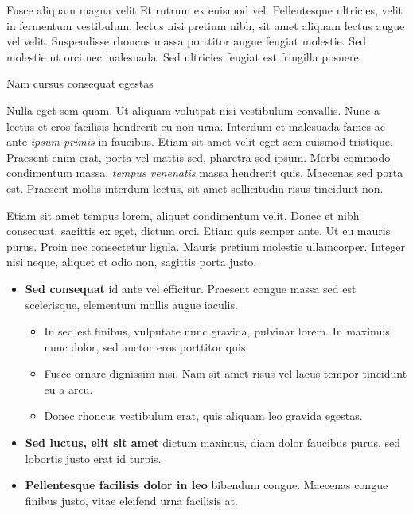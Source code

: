 \documentclass[final]{beamer}
\newlength{\colwidth}
\begin{document}
\begin{frame}[t]
\begin{columns}[t]
\begin{column}{\colwidth}
\begin{block}{Fusce aliquam magna velit}
    Et rutrum ex euismod vel. Pellentesque ultricies, velit in fermentum
    vestibulum, lectus nisi pretium nibh, sit amet aliquam lectus augue vel
    velit. Suspendisse rhoncus massa porttitor augue feugiat molestie. Sed
    molestie ut orci nec malesuada. Sed ultricies feugiat est fringilla
    posuere.

\vspace{1em}

  \end{block}

  \begin{block}{Nam cursus consequat egestas}

    Nulla eget sem quam. Ut aliquam volutpat nisi vestibulum convallis. Nunc a
    lectus et eros facilisis hendrerit eu non urna. Interdum et malesuada fames
    ac ante \textit{ipsum primis} in faucibus. Etiam sit amet velit eget sem
    euismod tristique. Praesent enim erat, porta vel mattis sed, pharetra sed
    ipsum. Morbi commodo condimentum massa, \textit{tempus venenatis} massa
    hendrerit quis. Maecenas sed porta est. Praesent mollis interdum lectus,
    sit amet sollicitudin risus tincidunt non.

    Etiam sit amet tempus lorem, aliquet condimentum velit. Donec et nibh
    consequat, sagittis ex eget, dictum orci. Etiam quis semper ante. Ut eu
    mauris purus. Proin nec consectetur ligula. Mauris pretium molestie
    ullamcorper. Integer nisi neque, aliquet et odio non, sagittis porta justo.

    \begin{itemize}
      \item \textbf{Sed consequat} id ante vel efficitur. Praesent congue massa
        sed est scelerisque, elementum mollis augue iaculis.
        \begin{itemize}
          \item In sed est finibus, vulputate
            nunc gravida, pulvinar lorem. In maximus nunc dolor, sed auctor eros
            porttitor quis.
          \item Fusce ornare dignissim nisi. Nam sit amet risus vel lacus
            tempor tincidunt eu a arcu.
          \item Donec rhoncus vestibulum erat, quis aliquam leo
            gravida egestas.
        \end{itemize}
      \item \textbf{Sed luctus, elit sit amet} dictum maximus, diam dolor
        faucibus purus, sed lobortis justo erat id turpis.
      \item \textbf{Pellentesque facilisis dolor in leo} bibendum congue.
        Maecenas congue finibus justo, vitae eleifend urna facilisis at.
    \end{itemize}


\end{block}
\end{column}
\end{columns}
\end{frame}
\end{document}
